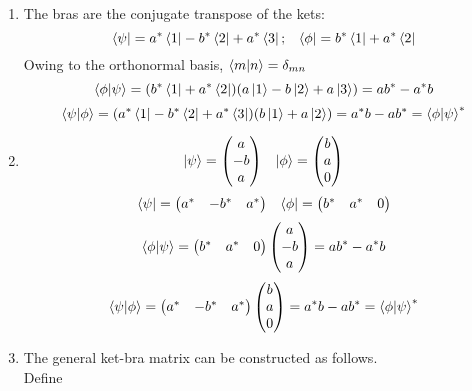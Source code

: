 \begin{sol}
\begin{enumerate}[label=\textbf{(\alph*)}]
\item
The bras are the conjugate transpose of the kets:
\begin{equation}
	\bra{\psi}=a^*\bra{1}-b^*\bra{2}+a^*\bra{3};\,\,\,\,\,\bra{\phi}=b^*\bra 1+a^*\bra 2
\end{equation}
Owing to the orthonormal basis, $\braket{m}{n}=\delta_{mn}$
\begin{equation}
	\braket{\phi}{\psi}=(b^*\bra 1+a^*\bra 2)(a\ket 1-b\ket 2+a\ket 3)=ab^*-a^*b
\end{equation}
\begin{equation}
	\braket{\psi}{\phi}=(a^*\bra{1}-b^*\bra{2}+a^*\bra{3})(b\ket 1+a\ket 2)=a^*b-ab^*=\braket{\phi}{\psi}^*
\end{equation}
\item
\begin{equation}
	\ket\psi=\begin{pmatrix}a\\-b\\a\end{pmatrix}\,\,\,\,\,\ket\phi=\begin{pmatrix}b\\a\\0\end{pmatrix}
\end{equation}
\begin{equation}
	\bra{\psi}=\begin{pmatrix}a^*&-b^*&a^*\end{pmatrix}\,\,\,\,\,\bra\phi=\begin{pmatrix}b^*&a^*&0\end{pmatrix}
\end{equation} 
\begin{equation}
	\braket{\phi}{\psi}=\begin{pmatrix}b^*&a^*&0\end{pmatrix}\begin{pmatrix}a\\-b\\a\end{pmatrix}=ab^*-a^*b
\end{equation}
\begin{equation}
	\braket{\psi}{\phi}=\begin{pmatrix}a^*&-b^*&a^*\end{pmatrix}\begin{pmatrix}b\\a\\0\end{pmatrix}=a^*b-ab^*=\braket{\phi}{\psi}^*
\end{equation} 
\item
The general ket-bra matrix can be constructed as follows. \\
Define


\end{enumerate}
\end{sol}
